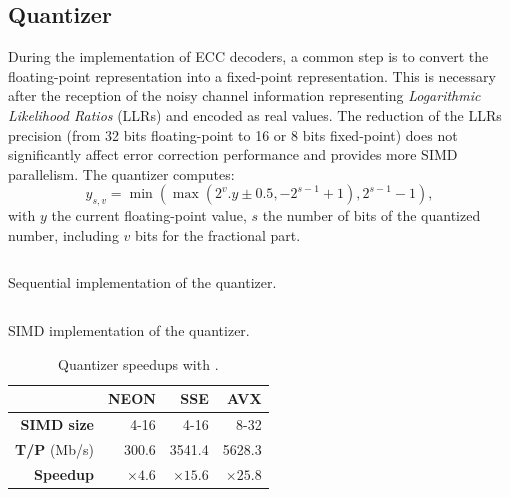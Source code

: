 \subsection{Quantizer}

During the implementation of ECC decoders, a common step is to convert the
floating-point representation into a fixed-point representation. This is
necessary after the reception of the noisy channel information representing
\textit{Logarithmic Likelihood Ratios} (LLRs) and encoded as real values. The
reduction of the LLRs precision (from 32 bits floating-point to 16 or 8 bits
fixed-point) does not significantly affect error correction performance and
provides more SIMD parallelism. The quantizer computes:
\begin{equation*}
y_{s,v} = \min(\max(2^v . y \pm 0.5, -2^{s-1} +1), 2^{s-1} -1),
\end{equation*}
with $y$ the current floating-point value, $s$ the number of bits of the
quantized number, including $v$ bits for the fractional part.

\begin{listing}
  \inputminted[frame=lines,linenos]{C++}{main/chapter3/src/quantizer/quantizer_seq.cpp}
  \caption{Sequential implementation of the quantizer.}
  \label{lst:vec_quantizer_seq}
\end{listing}

\begin{listing}
  \inputminted[frame=lines,linenos]{C++}{main/chapter3/src/quantizer/quantizer_simd.cpp}
  \caption{SIMD implementation of the quantizer.}
  \label{lst:vec_quantizer_simd}
\end{listing}

\begin{table}
  \centering
  \caption{Quantizer speedups with \MIPP.}
  \label{tab:vec_quantizer_speedup}
  \begin{tabular}{r | r  r r}
                      & \textbf{NEON} & \textbf{SSE}  & \textbf{AVX}  \\ \hline \hline
  \textbf{SIMD size}  & 4-16          & 4-16          & 8-32          \\ %
  \textbf{T/P} (Mb/s) & 300.6         & 3541.4        & 5628.3        \\ %
  \textbf{Speedup}    & $\times 4.6$  & $\times 15.6$ & $\times 25.8$ \\
  \end{tabular}
\end{table}

